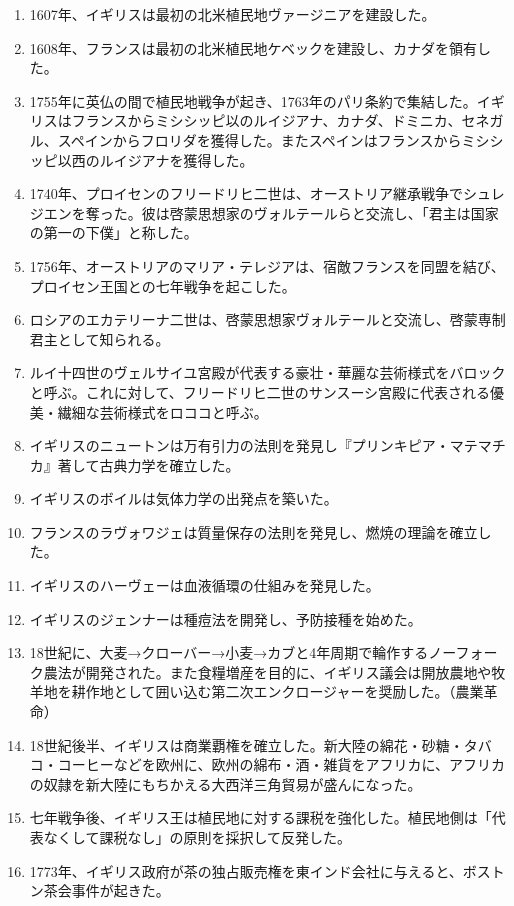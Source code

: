 \documentclass[twocolumn,autodetect-engine,dvipdfmx-if-dvi,ja=standard]{jsarticle} \usepackage{mystyle}
\begin{document}
\begin{enumerate}
\item 1607年、イギリスは最初の北米植民地ヴァージニアを建設した。
\item 1608年、フランスは最初の北米植民地ケベックを建設し、カナダを領有した。
\item 1755年に英仏の間で植民地戦争が起き、1763年のパリ条約で集結した。イギリスはフランスからミシシッピ以のルイジアナ、カナダ、ドミニカ、セネガル、スペインからフロリダを獲得した。またスペインはフランスからミシシッピ以西のルイジアナを獲得した。
\item 1740年、プロイセンのフリードリヒ二世は、オーストリア継承戦争でシュレジエンを奪った。彼は啓蒙思想家のヴォルテールらと交流し、「君主は国家の第一の下僕」と称した。
\item 1756年、オーストリアのマリア・テレジアは、宿敵フランスを同盟を結び、プロイセン王国との七年戦争を起こした。
\item ロシアのエカテリーナ二世は、啓蒙思想家ヴォルテールと交流し、啓蒙専制君主として知られる。
\item ルイ十四世のヴェルサイユ宮殿が代表する豪壮・華麗な芸術様式をバロックと呼ぶ。これに対して、フリードリヒ二世のサンスーシ宮殿に代表される優美・繊細な芸術様式をロココと呼ぶ。
\item イギリスのニュートンは万有引力の法則を発見し『プリンキピア・マテマチカ』著して古典力学を確立した。
\item イギリスのボイルは気体力学の出発点を築いた。
\item フランスのラヴォワジェは質量保存の法則を発見し、燃焼の理論を確立した。
\item イギリスのハーヴェーは血液循環の仕組みを発見した。
\item イギリスのジェンナーは種痘法を開発し、予防接種を始めた。
\item 18世紀に、大麦→クローバー→小麦→カブと4年周期で輪作するノーフォーク農法が開発された。また食糧増産を目的に、イギリス議会は開放農地や牧羊地を耕作地として囲い込む第二次エンクロージャーを奨励した。（農業革命）
\item 18世紀後半、イギリスは商業覇権を確立した。新大陸の綿花・砂糖・タバコ・コーヒーなどを欧州に、欧州の綿布・酒・雑貨をアフリカに、アフリカの奴隷を新大陸にもちかえる大西洋三角貿易が盛んになった。
\item 七年戦争後、イギリス王は植民地に対する課税を強化した。植民地側は「代表なくして課税なし」の原則を採択して反発した。
\item 1773年、イギリス政府が茶の独占販売権を東インド会社に与えると、ボストン茶会事件が起きた。

\end{enumerate}
\end{document}
